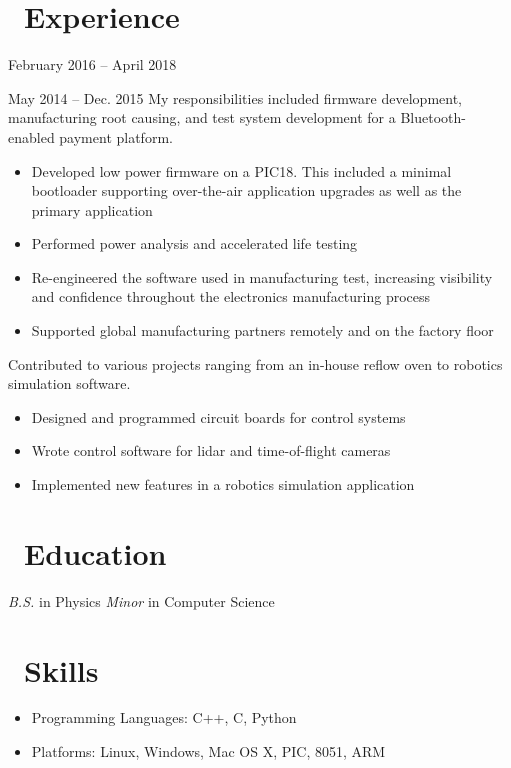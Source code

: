 \documentclass{resume}
\begin{document}


 
\section{\faWrench\ Experience}
          {February 2016 -- April 2018}
\vspace{3mm}

          {May 2014 -- Dec. 2015}
My responsibilities included firmware development, manufacturing
root causing, and test system development for a Bluetooth-enabled payment platform.
\begin{itemize}
  \item Developed low power firmware on a PIC18. This
      included a minimal bootloader supporting over-the-air application
      upgrades as well as the primary application
  \item Performed power analysis and accelerated life testing
  \item Re-engineered the software used in manufacturing test, increasing visibility
        and confidence throughout the electronics manufacturing process
  \item Supported global manufacturing partners remotely and on the factory floor
\end{itemize}
\vspace{3mm}

Contributed to various projects ranging from an in-house reflow oven to robotics
simulation software.
\begin{itemize}
  \item Designed and programmed circuit boards for control systems
  \item Wrote control software for lidar and time-of-flight cameras
  \item Implemented new features in a robotics simulation application
\end{itemize}
\vspace{3mm}

\section{\faGraduationCap\ Education}
\textit{B.S.} in Physics
\newline
\textit{Minor} in Computer Science

\section{\faCogs\ Skills}
\begin{itemize}[parsep=0.5ex]
  \item Programming Languages: C++, C, Python
  \item Platforms: Linux, Windows, Mac OS X, PIC, 8051, ARM
\end{itemize}
\end{document}
